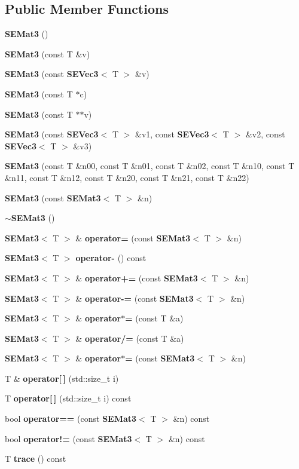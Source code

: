 \subsection*{Public Member Functions}
\begin{DoxyCompactItemize}
\item 
{\bf S\+E\+Mat3} ()
\item 
{\bf S\+E\+Mat3} (const T \&v)
\item 
{\bf S\+E\+Mat3} (const {\bf S\+E\+Vec3}$<$ T $>$ \&v)
\item 
{\bf S\+E\+Mat3} (const T $\ast$c)
\item 
{\bf S\+E\+Mat3} (const T $\ast$$\ast$v)
\item 
{\bf S\+E\+Mat3} (const {\bf S\+E\+Vec3}$<$ T $>$ \&v1, const {\bf S\+E\+Vec3}$<$ T $>$ \&v2, const {\bf S\+E\+Vec3}$<$ T $>$ \&v3)
\item 
{\bf S\+E\+Mat3} (const T \&n00, const T \&n01, const T \&n02, const T \&n10, const T \&n11, const T \&n12, const T \&n20, const T \&n21, const T \&n22)
\item 
{\bf S\+E\+Mat3} (const {\bf S\+E\+Mat3}$<$ T $>$ \&n)
\item 
{\bf $\sim$\+S\+E\+Mat3} ()
\item 
{\bf S\+E\+Mat3}$<$ T $>$ \& {\bf operator=} (const {\bf S\+E\+Mat3}$<$ T $>$ \&n)
\item 
{\bf S\+E\+Mat3}$<$ T $>$ {\bf operator-\/} () const 
\item 
{\bf S\+E\+Mat3}$<$ T $>$ \& {\bf operator+=} (const {\bf S\+E\+Mat3}$<$ T $>$ \&n)
\item 
{\bf S\+E\+Mat3}$<$ T $>$ \& {\bf operator-\/=} (const {\bf S\+E\+Mat3}$<$ T $>$ \&n)
\item 
{\bf S\+E\+Mat3}$<$ T $>$ \& {\bf operator$\ast$=} (const T \&a)
\item 
{\bf S\+E\+Mat3}$<$ T $>$ \& {\bf operator/=} (const T \&a)
\item 
{\bf S\+E\+Mat3}$<$ T $>$ \& {\bf operator$\ast$=} (const {\bf S\+E\+Mat3}$<$ T $>$ \&n)
\item 
T \& {\bf operator[$\,$]} (std\+::size\+\_\+t i)
\item 
T {\bf operator[$\,$]} (std\+::size\+\_\+t i) const 
\item 
bool {\bf operator==} (const {\bf S\+E\+Mat3}$<$ T $>$ \&n) const 
\item 
bool {\bf operator!=} (const {\bf S\+E\+Mat3}$<$ T $>$ \&n) const 
\item 
T {\bf trace} () const 
\item 
$$
\end{DoxyCompactItemize}

